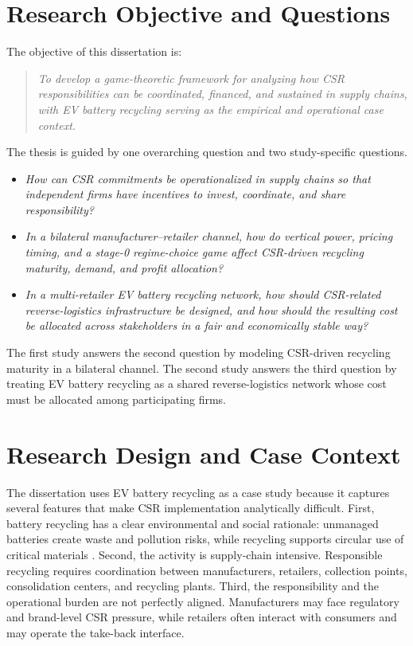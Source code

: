\section{Research Objective and Questions}
\label{sec:intro_objectives}

The objective of this dissertation is:

\begin{quote}
\emph{To develop a game-theoretic framework for analyzing how CSR responsibilities can be coordinated, financed, and sustained in supply chains, with EV battery recycling serving as the empirical and operational case context.}
\end{quote}

The thesis is guided by one overarching question and two study-specific questions.

\begin{itemize}
    \item \emph{How can CSR commitments be operationalized in supply chains so that independent firms have incentives to invest, coordinate, and share responsibility?}

    \item \emph{In a bilateral manufacturer--retailer channel, how do vertical power, pricing timing, and a stage-0 regime-choice game affect CSR-driven recycling maturity, demand, and profit allocation?}

    \item \emph{In a multi-retailer EV battery recycling network, how should CSR-related reverse-logistics infrastructure be designed, and how should the resulting cost be allocated across stakeholders in a fair and economically stable way?}
\end{itemize}

The first study answers the second question by modeling CSR-driven recycling maturity in a bilateral channel. The second study answers the third question by treating EV battery recycling as a shared reverse-logistics network whose cost must be allocated among participating firms.

\section{Research Design and Case Context}
\label{sec:intro_design}

The dissertation uses EV battery recycling as a case study because it captures several features that make CSR implementation analytically difficult. First, battery recycling has a clear environmental and social rationale: unmanaged batteries create waste and pollution risks, while recycling supports circular use of critical materials \citep{Harper2019, tembo2024lithium, rezaei2025review}. Second, the activity is supply-chain intensive. Responsible recycling requires coordination between manufacturers, retailers, collection points, consolidation centers, and recycling plants. Third, the responsibility and the operational burden are not perfectly aligned. Manufacturers may face regulatory and brand-level CSR pressure, while retailers often interact with consumers and may operate the take-back interface.


